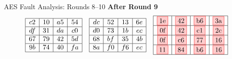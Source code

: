 \documentclass{beamer}
\newenvironment{tres important}[2][]{
	\setkeys{EmphEqEnv}{#2}
	\setkeys{EmphEqOpt}{box={\setlength{\fboxsep}{10pt}\fcolorbox{myNewColorA}{white}},#1}
	\EmphEqMainEnv}
{\endEmphEqMainEnv}
\begin{document}
    \begin{frame}[fragile]{AES Fault Analysis: Rounds 8–10}
    \scriptsize
    \textbf{After Round 9}
    \[
    \begin{array}{ccc}
    \begin{array}{|c|c|c|c|} \hline
    c2 & 10 & a5 & 54 \\ \hline
    df & 31 & da & c0 \\ \hline
    67 & 79 & 42 & 5d \\ \hline
    9b & 74 & 40 & fa \\ \hline
    \end{array}
    &
    \begin{array}{|c|c|c|c|} \hline
    dc & 52 & 13 & 6e \\ \hline
    d0 & 73 & 1b & ec \\ \hline
    68 & bf & 35 & 4b \\ \hline
    8a & f0 & f6 & ec \\ \hline
    \end{array}
    &
    \begin{array}{|c|c|c|c|} \hline
    \fcolorbox{red}{red!20}{1e} & \fcolorbox{red}{red!20}{42} & \fcolorbox{red}{red!20}{b6} & \fcolorbox{red}{red!20}{3a} \\ \hline
    \fcolorbox{red}{red!20}{0f} & \fcolorbox{red}{red!20}{42} & \fcolorbox{red}{red!20}{c1} & \fcolorbox{red}{red!20}{2c} \\ \hline
    \fcolorbox{red}{red!20}{0f} & \fcolorbox{red}{red!20}{c6} & \fcolorbox{red}{red!20}{77} & \fcolorbox{red}{red!20}{16} \\ \hline
    \fcolorbox{red}{red!20}{11} & \fcolorbox{red}{red!20}{84} & \fcolorbox{red}{red!20}{b6} & \fcolorbox{red}{red!20}{16} \\ \hline
    \end{array}
    \end{array}
    \]
    

\end{frame}
\end{document}

